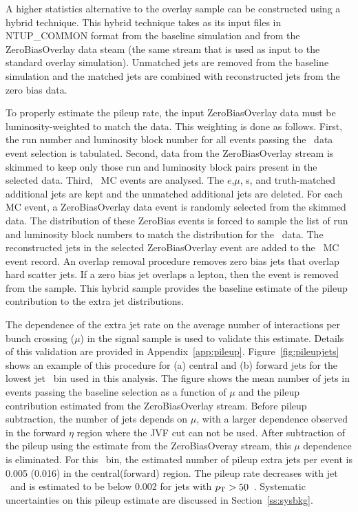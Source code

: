 A higher statistics alternative to the overlay sample can be constructed using a hybrid technique.
This hybrid technique takes as its input files in NTUP\_COMMON format
from the baseline simulation and from the ZeroBiasOverlay data steam (the same stream that is 
used as input to the standard overlay simulation).  
Unmatched jets are removed from the baseline simulation
and the matched jets are combined with reconstructed jets from the zero bias data.  

To properly estimate the pileup rate, the input ZeroBiasOverlay data must be luminosity-weighted
to match the data.  This weighting is done as follows.  First, the run number and luminosity block number 
for all events passing the \emubb\ data event selection is tabulated.  Second, data from the ZeroBiasOverlay
stream is skimmed to keep only those run and luminosity block pairs present in the selected data.
Third, \ttbar\ MC events are analysed.
The $e$,$\mu$, \bjet s, and truth-matched additional jets are kept and the unmatched
additional jets are deleted.  For each MC event, a ZeroBiasOverlay data event is 
randomly selected from the skimmed data.
The distribution of these ZeroBias events is forced to sample the list of run and luminosity block numbers
to match the distribution for the \emubb\ data.  The reconstructed jets in the selected ZeroBiasOverlay
event are added to the \ttbar\ MC event record.  An overlap 
removal procedure removes zero bias jets that overlap hard scatter jets.
If a zero bias jet overlaps a lepton, then the event is removed from the sample. 
This hybrid sample provides the baseline estimate of the pileup contribution to the 
extra jet distributions. 

The dependence of the extra jet rate on the average number of interactions per bunch crossing ($\mu$) in the signal sample is used to validate this estimate. Details of this validation are provided in Appendix~\ref{app:pileup}. Figure~\ref{fig:pileupjets} shows an example of this procedure for (a) central and (b) forward jets for the lowest jet \pt\ bin used in this analysis. The figure shows the mean number of jets in events passing the baseline selection as a function of $\mu$ and the pileup contribution estimated from the ZeroBiasOverlay stream. Before pileup subtraction, the number of jets depends on $\mu$, with a larger dependence observed in the forward $\eta$ region where the JVF cut can not be used. After subtraction of the pileup using the estimate from the ZeroBiasOveray stream, this $\mu$ dependence is eliminated. For this \pt\ bin, the estimated number of pileup extra jets per
event is 0.005 (0.016) in the central(forward) region. 
The pileup rate decreases with jet \pT\ and is estimated to be below 0.002 for jets with $p_{\text{T}}>50$~\GeV.
Systematic uncertainties on this pileup estimate are discussed in Section~\ref{ss:sysbkg}.
 

